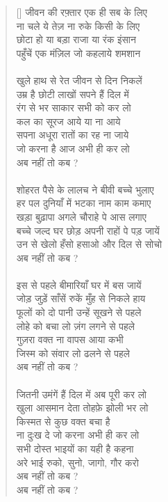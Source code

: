 \begin{verse}[\versewidth]\texthindi{
जीवन की रफ़्तार एक ही सब के लिए\\
ना चले ये तेज़ ना रुके किसी के लिए\\
छोटा हो या बड़ा राजा या रंक इंसान\\
पहुँचें एक मंज़िल जो कहलाये शमशान\\
\\
खुले हाथ से रेत जीवन से दिन निकलें\\
उम्र है छोटी लाखों सपने हैं दिल में\\
रंग से भर साकार सभी को कर लो\\
कल का सूरज आये या ना आये\\
सपना अधूरा रातों का रह ना जाये\\
जो करना है आज अभी ही कर लो\\
अब नहीं तो कब ?\\
\\
शोहरत पैसे के लालच ने बीवी बच्चे भुलाए\\
हर पल दुनियाँ में भटका नाम काम कमाए\\
खड़ा बुढ़ापा अगले चौराहे पे आस लगाए\\
बच्चे जल्द घर छोड़ अपनी राहों पे पड़ जायें\\
उन से खेलो हँसो हसाओ और दिल से सोचो\\
अब नहीं तो कब ?\\
\\
इस से पहले बीमारियाँ घर में बस जायें\\
जोड़ जुड़ें साँसें रुकें मुँह से निकले हाय\\
फूलों को दो पानी उन्हें सूखने से पहले\\
लोहे को बचा लो ज़ंग लगने से पहले\\
गुज़रा वक्त ना वापस आया कभी\\
जिस्म को संवार लो ढलने से पहले\\
अब नहीं तो कब ?\\
\\
जितनी उमंगें हैं दिल में अब पूरी कर लो\\
खुला आसमान देता तोहफ़े झोली भर लो\\
किस्मत से कुछ वक्त बचा है\\
ना दुःख दे जो करना अभी ही कर लो\\
सभी दोस्त भाइयों का यही है कहना\\
अरे भाई रुको, सुनो, जागो, गौर करो\\
अब नहीं तो कब ?\\
अब नहीं तो कब ?
}
\end{verse}

